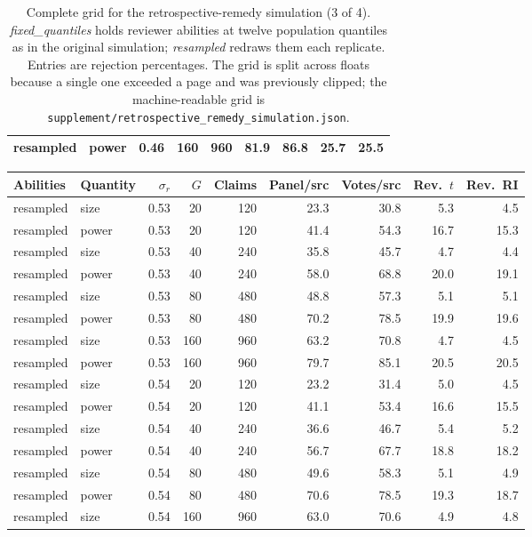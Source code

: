\begin{table}[p]
\begin{tabular}{@{}llrrrrrrr@{}}
resampled & power & 0.46 & 160 & 960 & 81.9 & 86.8 & 25.7 & 25.5 \\
\bottomrule
\end{tabular}
\caption{Complete grid for the retrospective-remedy simulation (3 of 4). \emph{fixed\_quantiles} holds reviewer abilities at twelve population quantiles as in the original simulation; \emph{resampled} redraws them each replicate. Entries are rejection percentages. The grid is split across floats because a single one exceeded a page and was previously clipped; the machine-readable grid is \texttt{supplement/retrospective\_remedy\_simulation.json}.}
\label{tab:retrospective-remedies-full-3}
\end{table}

\begin{table}[p]
\centering\scriptsize
\setlength{\tabcolsep}{4pt}
\begin{tabular}{@{}llrrrrrrr@{}}
\toprule
Abilities & Quantity & $\sigma_r$ & $G$ & Claims & Panel/src & Votes/src & Rev.\ $t$ & Rev.\ RI \\
\midrule
resampled & size & 0.53 & 20 & 120 & 23.3 & 30.8 & 5.3 & 4.5 \\
resampled & power & 0.53 & 20 & 120 & 41.4 & 54.3 & 16.7 & 15.3 \\
resampled & size & 0.53 & 40 & 240 & 35.8 & 45.7 & 4.7 & 4.4 \\
resampled & power & 0.53 & 40 & 240 & 58.0 & 68.8 & 20.0 & 19.1 \\
resampled & size & 0.53 & 80 & 480 & 48.8 & 57.3 & 5.1 & 5.1 \\
resampled & power & 0.53 & 80 & 480 & 70.2 & 78.5 & 19.9 & 19.6 \\
resampled & size & 0.53 & 160 & 960 & 63.2 & 70.8 & 4.7 & 4.5 \\
resampled & power & 0.53 & 160 & 960 & 79.7 & 85.1 & 20.5 & 20.5 \\
resampled & size & 0.54 & 20 & 120 & 23.2 & 31.4 & 5.0 & 4.5 \\
resampled & power & 0.54 & 20 & 120 & 41.1 & 53.4 & 16.6 & 15.5 \\
resampled & size & 0.54 & 40 & 240 & 36.6 & 46.7 & 5.4 & 5.2 \\
resampled & power & 0.54 & 40 & 240 & 56.7 & 67.7 & 18.8 & 18.2 \\
resampled & size & 0.54 & 80 & 480 & 49.6 & 58.3 & 5.1 & 4.9 \\
resampled & power & 0.54 & 80 & 480 & 70.6 & 78.5 & 19.3 & 18.7 \\
resampled & size & 0.54 & 160 & 960 & 63.0 & 70.6 & 4.9 & 4.8 \\

\end{tabular}
\end{table}
